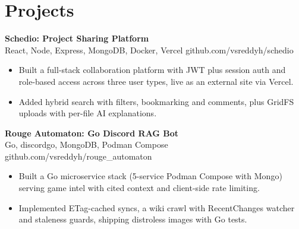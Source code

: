 \documentclass[a4paper,11pt]{article}
\newcommand{\resumeItem}[1]{\item \small{#1}}
\newcommand{\resumeSubheading}[4]{%
  \textbf{#1} \hfill \textbf{#2} \\
{#3} \hfill {#4}
}
\newcommand{\resumeSubHeadingListStart}{\begin{itemize}}
\newcommand{\resumeSubHeadingListEnd}{\end{itemize}}
\begin{document}
\section*{Projects}

\resumeSubheading
{Schedio: Project Sharing Platform}{}{React, Node, Express, MongoDB, Docker, Vercel}{github.com/vsreddyh/schedio}
\resumeSubHeadingListStart
\resumeItem{Built a full-stack collaboration platform with JWT plus session auth and role-based access across three user types, live as an external site via Vercel.}
\resumeItem{Added hybrid search with filters, bookmarking and comments, plus GridFS uploads with per-file AI explanations.}
\resumeSubHeadingListEnd

\resumeSubheading
{Rouge Automaton: Go Discord RAG Bot}{}{Go, discordgo, MongoDB, Podman Compose}{github.com/vsreddyh/rouge\_automaton}
\resumeSubHeadingListStart
\resumeItem{Built a Go microservice stack (5-service Podman Compose with Mongo) serving game intel with cited context and client-side rate limiting.}
\resumeItem{Implemented ETag-cached syncs, a wiki crawl with RecentChanges watcher and staleness guards, shipping distroless images with Go tests.}
\resumeSubHeadingListEnd


\vspace{-0.6em}
\end{document}
